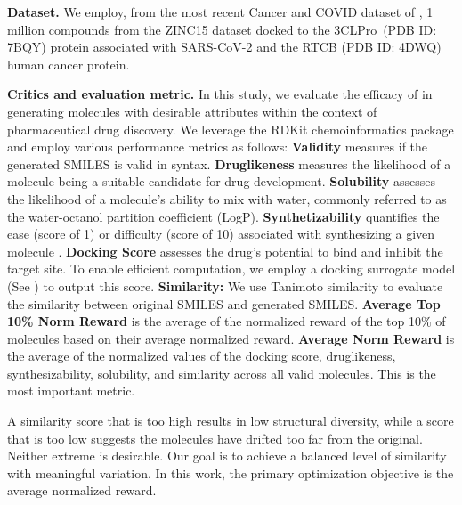 


\textbf{Dataset.}
We employ, from the most recent Cancer and COVID dataset of \citet{liu2023drugimprover}, 1 million compounds from the ZINC15 dataset docked to the 3CLPro~(PDB ID: 7BQY) protein associated with SARS-CoV-2 and the RTCB (PDB ID: 4DWQ) human cancer protein. 








{
\textbf{Critics and evaluation metric.} 
In this study, we evaluate the efficacy of \algname in generating molecules with desirable attributes within the context of pharmaceutical drug discovery.
{We leverage the RDKit  \citep{landrum2016rdkit} chemoinformatics package and employ various performance metrics as follows:}
{\textbf{Validity} measures if the generated SMILES is valid in syntax.}
\textbf{Druglikeness} measures the likelihood of a molecule being a suitable candidate for drug development.
\textbf{Solubility} assesses the likelihood of a molecule's ability to mix with water, commonly referred to as the water-octanol partition coefficient (LogP). 
\textbf{Synthetizability} quantifies the ease (score of 1) or difficulty (score of 10) associated with synthesizing a given molecule \citep{ertl2009estimation}.
\textbf{Docking Score} assesses the drug's potential to bind and inhibit the target site. 
To enable efficient computation, we employ a docking surrogate model (See ) to output this score.
{
\textbf{Similarity:} We use Tanimoto similarity to evaluate the similarity between original SMILES and generated SMILES.
\textbf{Average Top 10\% Norm Reward} is the average of the normalized reward of the top 10\% of molecules based on their average normalized reward.
\textbf{Average Norm Reward} is the average of the normalized values of the docking score, druglikeness, synthesizability, solubility, and similarity across all valid molecules. This is the most important metric. 
}
}
\begin{remark}
A similarity score that is too high results in low structural diversity, while a score that is too low suggests the molecules have drifted too far from the original. Neither extreme is desirable. Our goal is to achieve a balanced level of similarity with meaningful variation. In this work, the primary optimization objective is the average normalized reward.
\end{remark}





